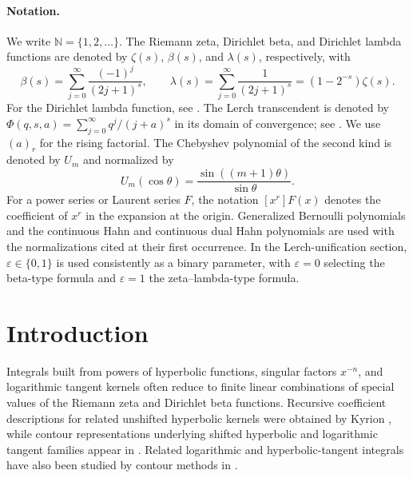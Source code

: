 \documentclass[11pt,twoside]{article}
\numberwithin{equation}{section}
\begin{document}
\vspace{0.2cm}

\paragraph{Notation.}
We write \(\mathbb N=\{1,2,\ldots\}\).  The Riemann zeta, Dirichlet beta,
and Dirichlet lambda functions are denoted by \(\zeta(s)\), \(\beta(s)\),
and \(\lambda(s)\), respectively, with
\[
\beta(s)=\sum_{j=0}^{\infty}\frac{(-1)^j}{(2j+1)^s},
\qquad
\lambda(s)=\sum_{j=0}^{\infty}\frac{1}{(2j+1)^s}
          =(1-2^{-s})\zeta(s).
\]
For the Dirichlet lambda function, see \cite{HuKim2019}.
The Lerch transcendent is denoted by
\(\Phi(q,s,a)=\sum_{j=0}^{\infty}q^j/(j+a)^s\) in its domain of
convergence; see \cite[Eq.~(25.14.1)]{NIST:DLMF}.  We use
\((a)_r\) for the rising factorial.  The Chebyshev polynomial of the second kind
\cite{MasonHandscomb2003,NIST:DLMF} is denoted by \(U_m\) and normalized by
\[
U_m(\cos\theta)=\frac{\sin((m+1)\theta)}{\sin\theta}.
\]
For a power series or Laurent series \(F\), the notation \([x^r]F(x)\)
denotes the coefficient of \(x^r\) in the expansion at the origin.
Generalized Bernoulli polynomials and the continuous Hahn and continuous
dual Hahn polynomials are used with the normalizations cited at their
first occurrence.  In the Lerch-unification section,
\(\varepsilon\in\{0,1\}\) is used consistently as a binary parameter,
with \(\varepsilon=0\) selecting the beta-type formula and
\(\varepsilon=1\) the zeta--lambda-type formula.

\vspace{0.5cm}

\section*{Introduction}

Integrals built from powers of hyperbolic functions, singular factors
\(x^{-n}\), and logarithmic tangent kernels often reduce to finite linear
combinations of special values of the Riemann zeta and Dirichlet beta
functions.  Recursive coefficient descriptions for related unshifted
hyperbolic kernels were obtained by Kyrion \cite{Kyrion2025}, while
contour representations underlying shifted hyperbolic and logarithmic
tangent families appear in \cite{talla_waffo_integral_2025}.  Related
logarithmic and hyperbolic-tangent integrals have also been studied by
contour methods in \cite{ReynoldsStauffer2020}.

\vspace{0.2cm}
\end{document}
